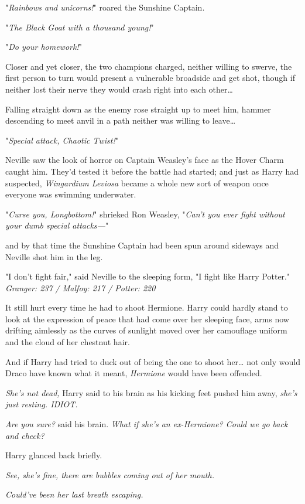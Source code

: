 "\emph{Rainbows and unicorns!}" roared the Sunshine Captain.

"\emph{The Black Goat with a thousand young!}"

"\emph{Do your homework!}"

Closer and yet closer, the two champions charged, neither willing to swerve,
the first person to turn would present a vulnerable broadside and get shot,
though if neither lost their nerve they would crash right into each
other{\ldots}

Falling straight down as the enemy rose straight up to meet him, hammer
descending to meet anvil in a path neither was willing to leave{\ldots}

"\emph{Special attack, Chaotic Twist!}"

Neville saw the look of horror on Captain Weasley's face as the Hover Charm
caught him. They'd tested it before the battle had started; and just as Harry
had suspected, \emph{Wingardium Leviosa} became a whole new sort of weapon once
everyone was swimming underwater.

"\emph{Curse you, Longbottom!}" shrieked Ron Weasley, "\emph{Can't you ever
fight without your dumb special attacks---}"

and by that time the Sunshine Captain had been spun around sideways and Neville
shot him in the leg.

"I don't fight fair," said Neville to the sleeping form, "I fight like Harry
Potter."
\later
\emph{Granger: 237 / Malfoy: 217 / Potter: 220}

It still hurt every time he had to shoot Hermione. Harry could hardly stand to
look at the expression of peace that had come over her sleeping face, arms now
drifting aimlessly as the curves of sunlight moved over her camouflage uniform
and the cloud of her chestnut hair.

And if Harry had tried to duck out of being the one to shoot her{\ldots} not
only would Draco have known what it meant, \emph{Hermione} would have been
offended.

\emph{She's not dead,} Harry said to his brain as his kicking feet pushed him
away, \emph{she's just resting. IDIOT.}

\emph{Are you sure?} said his brain. \emph{What if she's an ex-Hermione? Could
we go back and check?}

Harry glanced back briefly.

\emph{See, she's fine, there are bubbles coming out of her mouth.}

\emph{Could've been her last breath escaping.}


